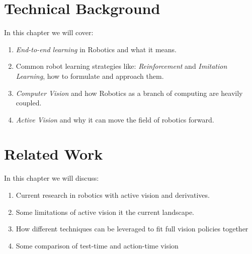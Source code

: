 \chapter{Technical Background}
  In this chapter we will cover:
  \begin{enumerate}
    \item \emph{End-to-end learning} in Robotics and what it means.
    \item Common robot learning strategies like: \emph{Reinforcement} and \emph{Imitation Learning}, how to formulate and approach them.
    \item \emph{Computer Vision} and how Robotics as a branch of computing are heavily coupled.
    \item \emph{Active Vision} and why it can move the field of robotics forward.
  \end{enumerate}


\chapter{Related Work}
  In this chapter we will discuss:
  \begin{enumerate}
    \item Current research in robotics with active vision and derivatives.
    \item Some limitations of active vision it the current landscape.
    \item How different techniques can be leveraged to fit full vision policies together
    \item Some comparison of test-time and action-time vision
  \end{enumerate}


